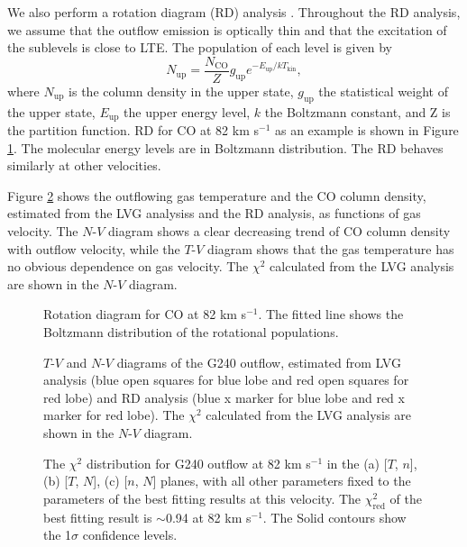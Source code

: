We also perform a rotation diagram (RD) analysis \citep{1999ApJ...517..209G}. Throughout the RD analysis, we assume that the outflow emission is optically thin and that the excitation of the sublevels is close to  LTE. The population of each level is given by 
\begin{equation}
N_{\mathrm{up}} = \frac{N_\mathrm{CO}}{Z} g_\mathrm{up} e^{-E_\mathrm{up}/kT_\mathrm{kin}},
\end{equation}
where $N_\mathrm{up}$ is the column density in the upper state, $g_\mathrm{up}$ the statistical weight of the upper state, $E_\mathrm{up}$ the upper energy level, $k$ the Boltzmann constant, and Z is the partition function.
RD for CO at 82 km s$^{-1}$ as an example is shown in Figure \ref{fig3}. The molecular energy levels are in Boltzmann distribution. The RD behaves similarly at other velocities. 

Figure \ref{fig:fig4} shows the outflowing gas temperature and the CO column density, estimated from the LVG analysiss and the RD analysis, as functions of gas velocity. The $N$-$V$ diagram shows a clear decreasing trend of CO column density with outflow velocity, while the $T$-$V$ diagram shows that the gas temperature has no obvious dependence on gas velocity. The $\chi^2$ calculated from the LVG analysis are shown in the $N$-$V$ diagram. 

\begin{figure}[tbp]
\caption{Rotation diagram for CO at 82 km s$^{-1}$.  The fitted line shows the Boltzmann distribution of the rotational populations. \label{fig3}}
\end{figure}

\begin{figure}
\caption{$T$-$V$ and $N$-$V$ diagrams of the G240 outflow, estimated from LVG analysis (blue open squares for blue lobe and red open squares for red lobe) and RD analysis (blue x marker for blue lobe and red x marker for red lobe). The $\chi^2$ calculated from the LVG analysis are shown in the $N$-$V$ diagram. \label{fig:fig4}}
\end{figure}

\begin{figure}
\caption{The $\chi^2$ distribution for G240 outflow at 82 km s$^{-1}$ in the (a) [$T$, $n$], (b) [$T$, $N$], (c) [$n$, $N$] planes, with all other parameters fixed to the parameters of the best fitting results at this velocity. The $\chi^2_{\mathrm{red}}$ of the best fitting result is $\sim$0.94 at 82 km s$^{-1}$. The Solid contours show the 1$\sigma$ confidence levels. \label{fig:fig5}}
\end{figure}

